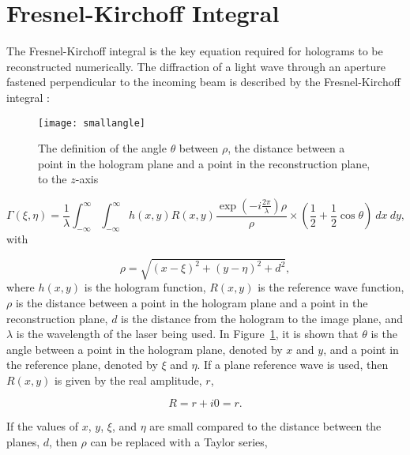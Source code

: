 \section{Fresnel-Kirchoff Integral}

The Fresnel-Kirchoff integral is the key equation required for holograms
to be reconstructed numerically.
The diffraction of a light wave through an aperture fastened perpendicular
to the incoming beam is described by the Fresnel-Kirchoff integral
\cite{schnars_digital_2002}:

    \begin{figure}
    \begin{center}
        \texttt{[image: smallangle]}
    \end{center}
    \caption{The definition of the angle $\theta$ between $\rho$, the distance between a point
    in the hologram plane and a point in the reconstruction plane,
    to the $z$-axis}
    \label{fig:smallangle}
    \end{figure}

\begin{equation}
    \Gamma(\xi,\eta) =
    \frac{1}{\lambda}\int_{-\infty}^{\infty}\int_{-\infty}^{\infty}h(x,y)R(x,y)\frac{\exp\left(
        -i\frac{2\pi}{\lambda} \right)\rho}{\rho}\times \left(
        \frac{1}{2}+\frac{1}{2}\cos\theta \right)~dx~dy,
        \label{fresnel-kirchoff}
    \end{equation}
    with

    \begin{equation}
        \rho = \sqrt{(x-\xi)^{2}+(y-\eta)^{2}+d^{2}} ,
    \end{equation}
    where $h(x,y)$ is the hologram function, $R(x,y)$ is the reference wave
    function, $\rho$ is the distance between a point in the hologram plane and
    a point in the reconstruction plane, $d$ is the distance from the hologram
    to the image plane, and $\lambda$ is the wavelength of the laser being used. 
    In Figure~\ref{fig:smallangle}, it is shown that $\theta$ is the angle
    between a point in the hologram plane, denoted by $x$ and $y$,
    and a point in the reference plane, denoted by $\xi$ and
    $\eta$.
    If a plane reference wave is used,
    then $R(x,y)$ is given by the real amplitude, $r$,

    \begin{equation}
        R = r+ i0 = r .
    \end{equation}

    If the values of $x$, $y$, 
    $\xi$, and $\eta$ are
    small compared to the distance between the planes, $d$, then $\rho$ can be
    replaced with a Taylor series,

